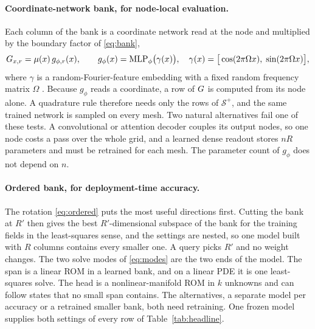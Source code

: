 \documentclass{article}
\begin{document}
\paragraph{Coordinate-network bank, for node-local evaluation.}
Each column of the bank is a coordinate network read at the node and
multiplied by the boundary factor of \eqref{eq:bank},
\begin{equation}
  G_{x,r}=\mu(x)\,g_{\phi,r}(x),
  \qquad
  g_\phi(x)=\mathrm{MLP}_\phi\big(\gamma(x)\big),
  \quad
  \gamma(x)=\big[\cos(2\pi\Omega x),\;\sin(2\pi\Omega x)\big],
  \label{eq:coordnet}
\end{equation}
where $\gamma$ is a random-Fourier-feature embedding with a fixed random
frequency matrix $\Omega$ \citep{Tancik2020FourierFeatures}. Because
$g_\phi$ reads a coordinate, a row of $G$ is computed from its node
alone. A quadrature rule therefore needs only the rows of $\mathcal S^{+}$,
and the same trained network is sampled on every mesh. Two natural
alternatives fail one of these tests. A convolutional or attention
decoder couples its output nodes, so one node costs a pass over the whole
grid, and a learned dense readout stores $nR$ parameters and must be
retrained for each mesh. The parameter count of $g_\phi$ does not depend
on $n$.

\paragraph{Ordered bank, for deployment-time accuracy.}
The rotation \eqref{eq:ordered} puts the most useful directions first.
Cutting the bank at $R'$ then gives the best $R'$-dimensional subspace of
the bank for the training fields in the least-squares sense, and the
settings are nested, so one model built with $R$ columns contains every
smaller one. A query picks $R'$ and no weight changes. The two solve modes
of \eqref{eq:modes} are the two ends of the model. The span is a linear
ROM in a learned bank, and on a linear PDE it is one least-squares solve.
The head is a nonlinear-manifold ROM in $k$ unknowns and can follow
states that no small span contains. The alternatives, a separate model
per accuracy or a retrained smaller bank, both need retraining. One frozen
model supplies both settings of every row of Table~\ref{tab:headline}.
\end{document}
